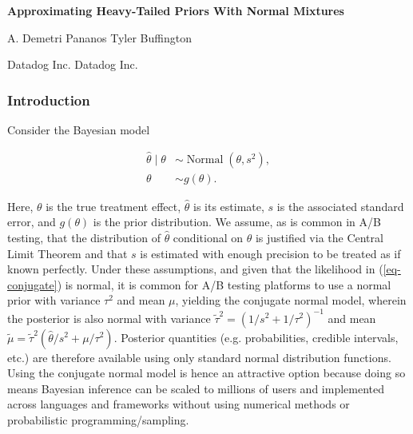 \documentclass[11pt,letterpaper]{article}
\begin{document}
\begin{center}
{\Large\bfseries Approximating Heavy-Tailed Priors With Normal Mixtures \par}
\vspace{0.4em}
{\large A. Demetri Pananos \qquad Tyler Buffington\par}
\vspace{0.15em}
{\footnotesize Datadog Inc. \qquad Datadog Inc.\par}
\end{center}

\vspace{-1.25em}

\subsubsection{Introduction}\label{introduction}

Consider the Bayesian model

\begin{equation}\label{eq-conjugate}
\begin{aligned}
\hat \theta \mid \theta &\sim \operatorname{Normal}(\theta, s^2), \\
\theta &\sim g(\theta).
\end{aligned}
\end{equation}

Here, $\theta$ is the true treatment effect, $\hat \theta$ is its estimate, $s$
is the associated standard error, and $g(\theta)$ is the prior
distribution.  We assume, as is common in A/B testing, that the distribution of $\hat \theta$ conditional on $\theta$ is justified via the Central Limit Theorem and that $s$ is estimated with enough precision to be treated as if known perfectly. Under these assumptions, and given that the
likelihood in (\ref{eq-conjugate}) is normal, it is common for A/B testing platforms to
use a normal prior with variance $\tau^2$ and mean $\mu$, yielding the
conjugate normal model, wherein the posterior is also
normal with variance $\tilde \tau^{2} = (1/s^2 + 1/\tau^2)^{-1}$ and
mean $\tilde \mu = \tilde \tau^{2}(\hat\theta/s^2 + \mu/\tau^2)$. Posterior
quantities (e.g. probabilities, credible intervals, etc.)
are therefore available using only standard normal distribution functions.
Using the conjugate normal model is hence an attractive option because doing so means Bayesian inference
can be scaled to millions of users and implemented across languages and
frameworks without using numerical methods or probabilistic
programming/sampling.
\end{document}
